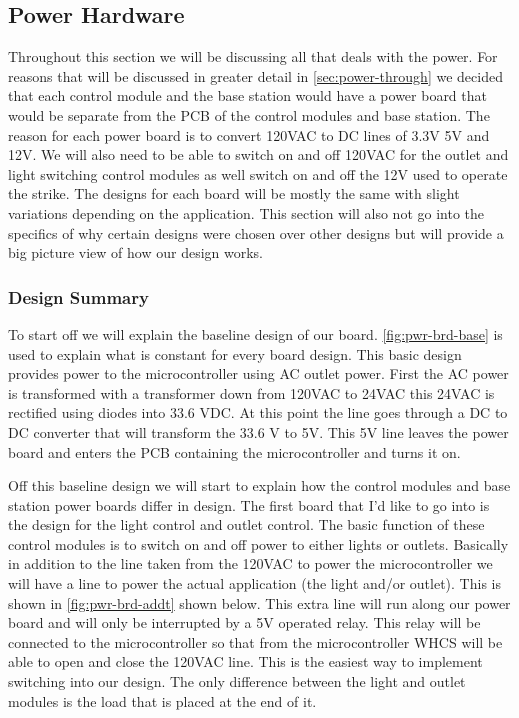 \subsection{Power Hardware}
\label{sec:power-hw}

Throughout this section we will be discussing all that deals with the
power. For reasons that will be discussed in greater detail in
\autoref{sec:power-through} we decided that each control module and the base
station would have a power board that would be separate from the PCB of the
control modules and base station. The reason for each power board is to convert
120VAC to DC lines of 3.3V 5V and 12V. We will also need to be able to switch
on and off 120VAC for the outlet and light switching control modules as well
switch on and off the 12V used to operate the strike. The designs for each
board will be mostly the same with slight variations depending on the
application. This section will also not go into the
specifics of why certain designs were chosen over other designs but will
provide a big picture view of how our design works.

\subsubsection{Design Summary}

To start off we will explain the baseline design of our board.
\autoref{fig:pwr-brd-base} is used to explain what is constant for every board design. This
basic design provides power to the microcontroller using AC outlet power. First
the AC power is transformed with a transformer down from 120VAC to 24VAC this
24VAC is rectified using diodes into 33.6 VDC. At this point the line goes
through a DC to DC converter that will transform the 33.6 V to 5V. This 5V line
leaves the power board and enters the PCB containing the microcontroller and
turns it on.


Off this baseline design we will start to explain how the
control modules and base station power boards differ in design. The first
board that I{}'d like to go into is the design for the light control and
outlet control. The basic function of these control modules is to switch on
and off power to either lights or outlets. Basically in addition to the line
taken from the 120VAC to power the microcontroller we will have a line to
power the actual application (the light and/or outlet). This is shown in
\autoref{fig:pwr-brd-addt} shown below. This extra line will run along our
power board and will only be interrupted by a 5V operated relay. This relay
will be connected to the microcontroller so that from the microcontroller
WHCS will be able to open and close the 120VAC line. This is the easiest way
to implement switching into our design. The only difference between the light
and outlet modules is the load that is placed at the end of it.

